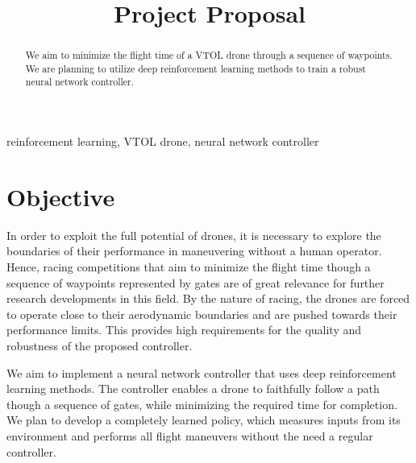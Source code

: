 \documentclass[conference]{IEEEtran}
\begin{document}
\title{Project Proposal}

\author{
\and
{}






}

\maketitle




\begin{abstract}
We aim to minimize the flight time of a VTOL drone through a sequence of waypoints. We are planning to utilize deep reinforcement learning methods to train a robust neural network controller.

\end{abstract}

\begin{IEEEkeywords}
reinforcement learning, VTOL drone, neural network controller
\end{IEEEkeywords}

\section{Objective}
In order to exploit the full potential of drones, it is necessary to explore the boundaries of their performance in maneuvering without a human operator. Hence, racing competitions that aim to minimize the flight time though a sequence of waypoints represented by gates are of great relevance for further research developments in this field. 
By the nature of racing, the drones are forced to operate close to their aerodynamic boundaries and are pushed towards their performance limits. This provides high requirements for the quality and robustness of the proposed controller.

We aim to implement a neural network controller that uses deep reinforcement learning methods.
The controller enables a drone to faithfully follow a path though a sequence of gates, while minimizing the required time for completion. We plan to develop a completely learned policy, which measures inputs from its environment and performs all flight maneuvers without the need a regular controller.
\end{document}
